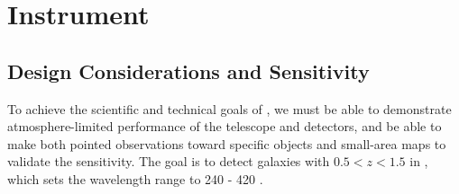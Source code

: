 \section{Instrument}
\label{sec:Instrument}

\subsection{Design Considerations and Sensitivity} 
\label{sec:DesignConsiderations}  

To achieve the scientific and technical goals of \name, we must be able to demonstrate atmosphere-limited performance of the telescope and detectors, and be able to make both pointed observations toward specific objects and small-area maps to validate the sensitivity.  The goal is to detect galaxies with $0.5 < z < 1.5$ in \cii, which sets the wavelength range to 240 - 420 \mum.


